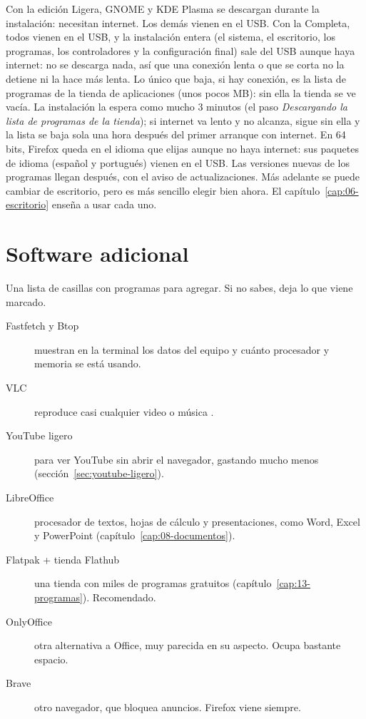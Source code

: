 Con la edición Ligera, GNOME y KDE Plasma se descargan durante la
instalación: necesitan internet. Los demás vienen en el USB. Con la
Completa, todos vienen en el USB, y la instalación entera (el sistema,
el escritorio, los programas, los controladores y la configuración
final) sale del USB aunque haya internet: no se descarga nada, así que
una conexión lenta o que se corta no la detiene ni la hace más lenta.
Lo único que baja, si hay conexión, es la lista de programas de la
tienda de aplicaciones (unos pocos MB): sin ella la tienda se ve vacía.
La instalación la espera como mucho 3 minutos (el paso
\emph{Descargando la lista de programas de la tienda}); si internet va
lento y no alcanza, sigue sin ella y la lista se baja sola una hora
después del primer arranque con internet.
En 64 bits, Firefox queda en el idioma que elijas aunque no haya internet: sus
paquetes de idioma (español y portugués) vienen en el USB.
Las versiones nuevas de los programas llegan después, con el aviso de
actualizaciones. Más adelante se puede cambiar de
escritorio, pero es más sencillo elegir bien ahora. El
capítulo~\ref{cap:06-escritorio} enseña a usar cada uno.

\section{Software adicional}\label{sec:software-adicional}

Una lista de casillas con programas para agregar. Si no sabes, deja lo
que viene marcado.


\begin{description}
  \item[Fastfetch y Btop] muestran en la terminal los datos del equipo y
    cuánto procesador y memoria se está usando.
  \item[VLC] reproduce casi cualquier video o música \cite{vlc}.
  \item[YouTube ligero] para ver YouTube sin abrir el navegador, gastando
    mucho menos (sección~\ref{sec:youtube-ligero}).
  \item[LibreOffice] procesador de textos, hojas de cálculo y
    presentaciones, como Word, Excel y PowerPoint
    (capítulo~\ref{cap:08-documentos}).
  \item[Flatpak + tienda Flathub] una tienda con miles de programas gratuitos
    (capítulo~\ref{cap:13-programas}). Recomendado.
  \item[OnlyOffice] otra alternativa a Office, muy parecida en su aspecto.
    Ocupa bastante espacio.
  \item[Brave] otro navegador, que bloquea anuncios. Firefox viene siempre.
\end{description}

